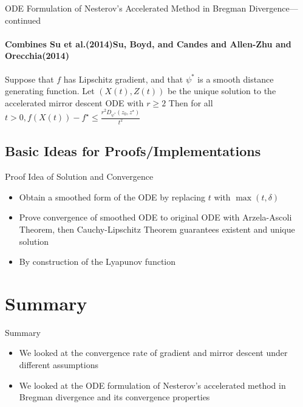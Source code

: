 \documentclass[english]{beamer}
\begin{document}
\begin{frame}{ODE Formulation of Nesterov's Accelerated Method in Bregman Divergence---continued}
\framesubtitle{Combines Su et al.(2014)Su, Boyd, and Candes and Allen-Zhu and Orecchia(2014)}
\begin{theorem}
Suppose that $f$ has Lipschitz gradient, and that $\psi^{*}$ is a smooth distance generating function. Let $(X(t), Z(t))$ be the unique solution to the accelerated mirror descent ODE with $r \geq 2$ Then for all $t>0, f(X(t))-f^{\star} \leq \frac{r^{2} D_{\psi^{*}}\left(z_{0}, z^{\star}\right)}{t^{2}}$
\end{theorem}
\end{frame}


\subsection{Basic Ideas for Proofs/Implementations}

\begin{frame}{Proof Idea of Solution and Convergence}
\begin{itemize}
\item<1-> Obtain a smoothed form of the ODE by replacing $t$ with $\max (t, \delta)$

\item<2-> Prove convergence of smoothed ODE to original ODE with Arzela-Ascoli Theorem, then Cauchy-Lipschitz Theorem guarantees existent and unique solution

\item<3-> By construction of the Lyapunov function
\end{itemize}
\end{frame}

\section*{Summary}
\begin{frame}{Summary}
\begin{itemize}
\item We looked at the convergence rate of gradient and mirror descent under different assumptions
\item We looked at the ODE formulation of Nesterov's accelerated method in Bregman divergence and its convergence properties
\end{itemize}
\medskip{}

\end{frame}
\end{document}
